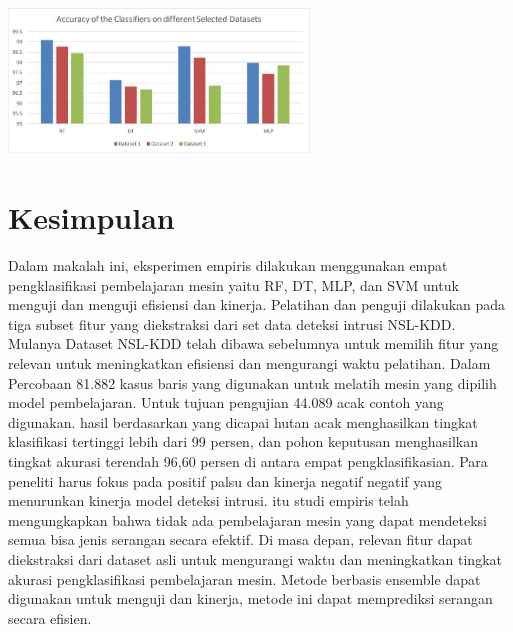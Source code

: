 \documentclass[conference]{IEEEtran}
\begin{document}
\begin{minipage}{\linewidth}
\centerline{\includegraphics[width=80mm]{Gambar/gambar3.JPG}}
\label{fig2}
\end{minipage}

\section{Kesimpulan}

Dalam makalah ini, eksperimen empiris dilakukan menggunakan empat pengklasifikasi pembelajaran mesin yaitu RF, DT, MLP, dan SVM untuk menguji dan menguji efisiensi dan kinerja. Pelatihan dan penguji dilakukan pada tiga subset fitur yang diekstraksi dari set data deteksi intrusi NSL-KDD. Mulanya Dataset NSL-KDD telah dibawa sebelumnya untuk memilih fitur yang relevan untuk meningkatkan efisiensi dan mengurangi waktu pelatihan. Dalam Percobaan 81.882 kasus baris yang digunakan untuk melatih mesin yang dipilih model pembelajaran. Untuk tujuan pengujian 44.089 acak contoh yang digunakan. hasil berdasarkan yang dicapai hutan acak menghasilkan tingkat klasifikasi tertinggi lebih dari 99 persen, dan pohon keputusan menghasilkan tingkat akurasi terendah 96,60 persen di antara empat pengklasifikasian. Para peneliti harus fokus pada positif palsu dan kinerja negatif negatif yang menurunkan kinerja model deteksi intrusi. itu studi empiris telah mengungkapkan bahwa tidak ada pembelajaran mesin yang dapat mendeteksi semua bisa jenis serangan secara efektif. Di masa depan, relevan fitur dapat diekstraksi dari dataset asli untuk mengurangi waktu dan meningkatkan tingkat akurasi pengklasifikasi pembelajaran mesin. Metode berbasis ensemble dapat digunakan untuk menguji dan kinerja, metode ini dapat memprediksi serangan secara efisien.



\end{document}

